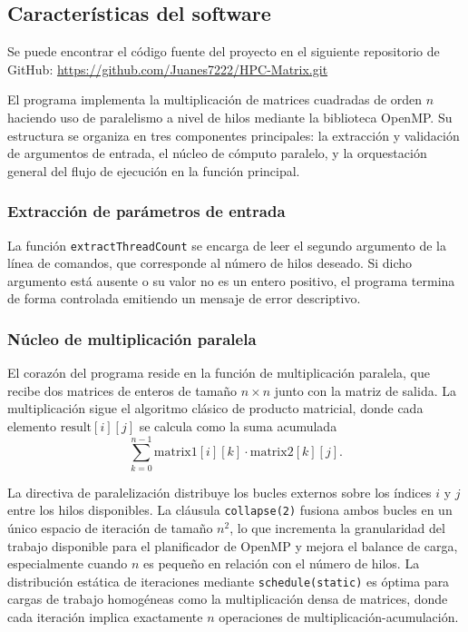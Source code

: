 \subsection{Características del software}

Se puede encontrar el código fuente del proyecto en el siguiente repositorio de GitHub: \url{https://github.com/Juanes7222/HPC-Matrix.git}

El programa implementa la multiplicación de matrices cuadradas de orden \(n\) haciendo uso de paralelismo a nivel de hilos mediante la biblioteca OpenMP. Su estructura se organiza en tres componentes principales: la extracción y validación de argumentos de entrada, el núcleo de cómputo paralelo, y la orquestación general del flujo de ejecución en la función principal.

\subsubsection{Extracción de parámetros de entrada}

La función \texttt{extractThreadCount} se encarga de leer el segundo argumento de la línea de comandos, que corresponde al número de hilos deseado. Si dicho argumento está ausente o su valor no es un entero positivo, el programa termina de forma controlada emitiendo un mensaje de error descriptivo. 

\subsubsection{Núcleo de multiplicación paralela}

El corazón del programa reside en la función de multiplicación paralela, que recibe dos matrices de enteros de tamaño \(n \times n\) junto con la matriz de salida. La multiplicación sigue el algoritmo clásico de producto matricial, donde cada elemento \(\text{result}[i][j]\) se calcula como la suma acumulada
\[
    \sum_{k=0}^{n-1} \text{matrix1}[i][k] \cdot \text{matrix2}[k][j].
\]

La directiva de paralelización distribuye los bucles externos sobre los índices \(i\) y \(j\) entre los hilos disponibles. La cláusula \texttt{collapse(2)} fusiona ambos bucles en un único espacio de iteración de tamaño \(n^2\), lo que incrementa la granularidad del trabajo disponible para el planificador de OpenMP y mejora el balance de carga, especialmente cuando \(n\) es pequeño en relación con el número de hilos. La distribución estática de iteraciones mediante \texttt{schedule(static)} es óptima para cargas de trabajo homogéneas como la multiplicación densa de matrices, donde cada iteración implica exactamente \(n\) operaciones de multiplicación-acumulación.

